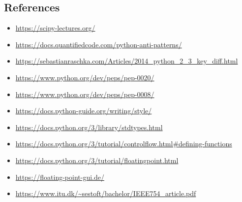 \subsection{References}
\begin{itemize}
    \item[-] \url{https://scipy-lectures.org/}
    \item[-] \url{https://docs.quantifiedcode.com/python-anti-patterns/}
    \item[-] \url{https://sebastianraschka.com/Articles/2014_python_2_3_key_diff.html}
    \item[-] \url{https://www.python.org/dev/peps/pep-0020/}
    \item[-] \url{https://www.python.org/dev/peps/pep-0008/}
    \item[-] \url{https://docs.python-guide.org/writing/style/}
    \item[-] \url{https://docs.python.org/3/library/stdtypes.html}
    \item[-] \url{https://docs.python.org/3/tutorial/controlflow.html\#defining-functions}
    \item[-] \url{https://docs.python.org/3/tutorial/floatingpoint.html}
    \item[-] \url{https://floating-point-gui.de/}
    \item[-] \url{https://www.itu.dk/~sestoft/bachelor/IEEE754_article.pdf}
\end{itemize}